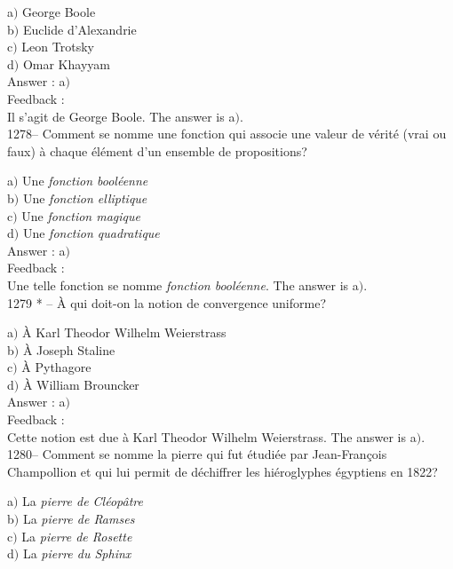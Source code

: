 ﻿\documentclass[letterpaper, 12pt]{article}
\begin{document}
a$)$ George Boole \\
b$)$ Euclide d'Alexandrie \\
c$)$ Leon Trotsky \\
d$)$ Omar Khayyam\\

Answer : a$)$\\

Feedback : \\
Il s'agit de George Boole.
The answer is  a$)$.\\

1278-- Comment se nomme une fonction qui associe une valeur de v\'erit\'e
(vrai ou faux) \`a chaque
\'el\'ement d'un ensemble de propositions?

a$)$ Une {\sl fonction bool\'eenne} \\
b$)$ Une {\sl fonction elliptique} \\
c$)$ Une {\sl fonction magique} \\
d$)$ Une {\sl fonction quadratique}\\

Answer : a$)$\\

Feedback : \\
Une telle fonction se nomme {\sl fonction bool\'eenne}.
The answer is  a$)$.\\

1279 * -- \`A qui doit-on la notion de convergence uniforme?

a$)$ \`A Karl Theodor Wilhelm Weierstrass \\
b$)$ \`A Joseph Staline \\
c$)$ \`A Pythagore \\
d$)$ \`A William Brouncker\\

Answer : a$)$\\

Feedback : \\
Cette notion est due \`a Karl Theodor Wilhelm Weierstrass.
The answer is  a$)$.\\

1280-- Comment se nomme la pierre qui fut \'etudi\'ee par
Jean-Fran\c cois Champollion et qui lui permit de d\'echiffrer les
hi\'eroglyphes \'egyptiens en 1822?

a$)$ La {\sl pierre de Cl\'eop\^atre} \\
b$)$ La {\sl pierre de Ramses} \\
c$)$ La {\sl pierre de Rosette} \\
d$)$ La {\sl pierre du Sphinx}\\
\end{document}
